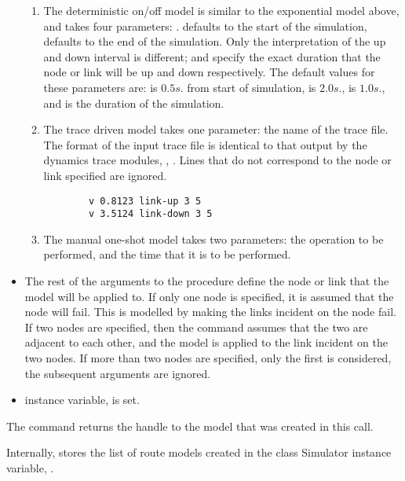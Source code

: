 \begin{list}{---}{}
\begin{itemize}
\begin{enumerate}
\item The deterministic on/off model
is similar to the exponential model above, and  takes four parameters:
.
 defaults to the start of the simulation,
 defaults to the end of the simulation.
Only the interpretation of the up and down interval is different;
 and  specify the exact duration
that the node or link will be up and down respectively.
The default values for these parameters are:
 is $0.5s.$ from start of simulation,
 is $2.0s.$,
 is $1.0s.$, and
 is the duration of the simulation.
\item The trace driven model takes one parameter:
the name of the trace file.
The format of the input trace file is identical to that 
output by the dynamics trace modules, \viz,
.
Lines that do not correspond to the node or link specified are ignored.
{\small
\begin{verbatim}
        v 0.8123 link-up 3 5
        v 3.5124 link-down 3 5
\end{verbatim}
}
\item The manual one-shot model takes two parameters:
the operation to be performed, and the time that it is to be
performed.
\end{enumerate}

\item %
The rest of the arguments to the  procedure
define the node or link that the model will be applied to.
If only one node is specified,
it is assumed that the node will fail.
This is modelled by making the links incident on the node fail.
If two nodes are specified, then the command assumes that
the two are adjacent to each other, and the model is applied to the
link incident on the two nodes.
If more than two nodes are specified, only the first is considered,
the subsequent arguments are ignored.

\item %
  instance variable,  is set.
\end{itemize}
The command returns the handle to the model that was created in this call.

Internally,  stores the list of route models created
in the class Simulator instance variable, .


\end{list}
